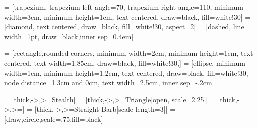 \usetikzlibrary{shapes.geometric, arrows, fit, calc, automata, positioning, arrows.meta, decorations.markings}

 = [trapezium, trapezium left angle=70, trapezium right angle=110, minimum width=3cm, minimum height=1cm, text centered, draw=black, fill=white!30]
 = [diamond, text centered, draw=black, fill=white!30, aspect=2]
 = [dashed, line width=1pt, draw=black,inner sep=0.4em]

\newcommand\coordSys[2]{
    \draw[step=1cm,gray, thick] (-.25,-.25) grid (#1.9,#2.9);
    \draw[thick,->] (0,0) -- (#1.5,0) node[anchor=north west] {$x$};
    \draw[thick,->] (0,0) -- (0,#2.5) node[anchor=south east] {$y$};
    \foreach \x in {0,...,#1}
       \draw (\x cm,1pt) -- (\x cm,-1pt) node[below=.2cm] {$\x$};
    \foreach \y in {0,...,#2}
        \draw (1pt,\y cm) -- (-1pt,\y cm) node[left=.2cm] {$\y$};
}

\newcommand\drawDBM[2]{\filldraw[fill=#2, draw=black] foreach \p in #1 {-- \p} -- cycle;}




\def\bottom#1#2{\hbox{\vbox to #1{\vfill\hbox{#2}}}}
 = [rectangle,rounded corners, minimum width=2cm, minimum height=1cm, text centered, text width=1.85cm, draw=black, fill=white!30,]
 = [ellipse, minimum width=1cm, minimum height=1.2cm,
text centered, draw=black, fill=white!30, node distance=1.3cm and 0cm, text width=2.5cm, inner sep=-.2cm]

 = [thick,->,>=Stealth]
 = [thick,->,>={Triangle[open, scale=2.25]}]
 = [thick,->,>=]
 = [thick,->,>={Straight Barb[scale length=3]}]
 = [draw,circle,scale=.75,fill=black]


